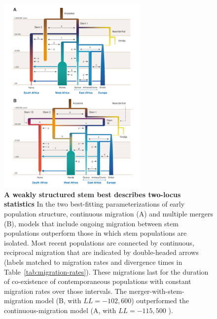 \documentclass[]{article}
\begin{document}
\begin{figure}[t!]
    \centering
    \includegraphics[width=0.65\textwidth]{figures/fig2-melisa}
    \caption{
        \textbf{A weakly structured stem best describes two-locus statistics}
        In the two best-fitting parameterizations of early population structure,
        continuous migration (A) and multiple mergers (B), models
        that include ongoing migration between stem populations outperform
        those in which stem populations are isolated. Most recent populations are
        connected by continuous, reciprocal migration that are indicated by 
        double-headed arrows (labels matched to migration rates and divergence
        times in Table~\ref{tab:migration-rates}). These migrations last for the
        duration of co-existence of contemporaneous populations with constant
        migration rates over those intervals. The
        merger-with-stem-migration model (B, with  $LL=-102,600$) outperformed the
        continuous-migration model (A, with $LL=-115,500$ ).
    }
    \label{fig:2}
\end{figure}
\end{document}
